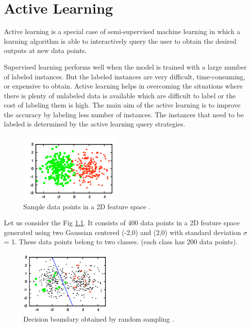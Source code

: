 
\chapter{Active Learning}

Active learning is a special case of semi-supervised machine learning in which a learning algorithm is able to interactively query the user to obtain the desired outputs at new data points. \cite{active_learning}

Supervised learning performs well when the model is trained with a large number of labeled instances.  But the labeled instances are very difficult, time-consuming, or expensive to obtain.  Active learning helps in overcoming the situations where there is plenty of unlabeled data is available which are difficult to label or the cost of labeling them is high.  The main aim of the active learning is to improve the accuracy by labeling less number of instances. The instances that need to be labeled is determined by the active learning query strategies.\cite{Settles2010}

\begin{figure}[h!]
	\centering
	\includegraphics[scale=1]{images/sample_data}
	\caption{Sample data points  in a 2D feature space  \cite{Settles2010}.}
	\label{sample_data}
\end{figure}

Let us consider the Fig \ref{sample_data}. It consists of 400 data points in a 2D feature space generated using two Gaussian centered  (-2,0) and (2,0) with standard deviation $\sigma$ = 1.  These data points belong to two classes. (each class has 200 data points).

\begin{figure}[h!]
	\centering
	\includegraphics[scale=1]{images/random_sampling}
	\caption{Decision boundary obtained by random sampling \cite{Settles2010}.}
	\label{random_sampling}
\end{figure}

